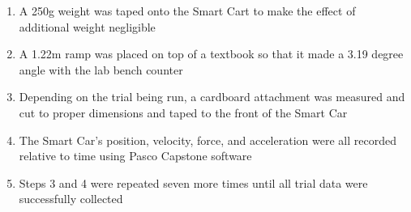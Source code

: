 \begin{enumerate}
    \item A 250g weight was taped onto the Smart Cart to make the effect of additional weight negligible
    \item A 1.22m ramp was placed on top of a textbook so that it made a 3.19 degree angle with the lab bench counter
    \item Depending on the trial being run, a cardboard attachment was measured and cut to proper dimensions and taped to the front of the Smart Car
    \item The Smart Car's position, velocity, force, and acceleration were all recorded relative to time using Pasco Capstone software
    \item Steps 3 and 4 were repeated seven more times until all trial data were successfully collected
\end{enumerate}
